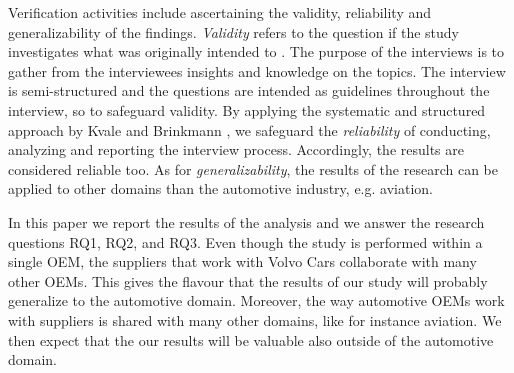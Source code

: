  Verification activities include ascertaining the validity, reliability and generalizability of the findings. {\em Validity} refers to the question if the study investigates what was originally intended to \cite{Kvale2015Interviews}. The purpose of the interviews is to gather from the interviewees insights and knowledge on the topics. The interview is semi-structured and the questions are intended as guidelines throughout the interview, so to safeguard validity. %
By applying the systematic and structured approach by Kvale and Brinkmann \cite{Kvale2015Interviews}, we safeguard the {\em reliability} of conducting, analyzing and reporting the interview process. Accordingly, the results are considered reliable too. As for {\em generalizability}, the results of the research can be applied to other domains than the automotive industry, e.g. aviation. %

 In this paper we report the results of the analysis and we answer the research questions RQ1, RQ2, and RQ3. 
Even though the study is performed within a single OEM, the suppliers that work with Volvo Cars collaborate with many other OEMs. This gives the flavour that the results of our study will probably generalize to the automotive domain. Moreover, the way automotive OEMs work with suppliers is shared with many other domains, like for instance aviation. We then expect that the our results will be valuable also outside of the automotive domain.


